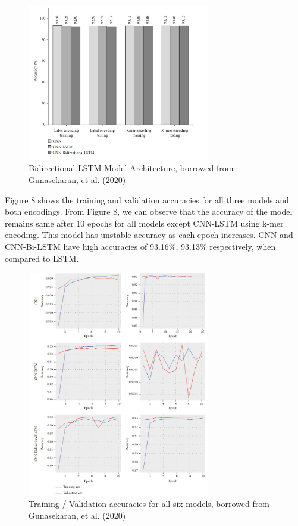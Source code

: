 \documentclass[journal]{IEEEtran}
\begin{document}
\begin{figure}
  \centering
  \includegraphics[width=8cm]{figures/accuracy.png}
  \caption{Bidirectional LSTM Model Architecture, borrowed from Gunasekaran, et al. (2020)}
\end{figure}

Figure 8 shows the training and validation accuracies for all three models and both encodings. 
From Figure 8, we can observe that the accuracy of the model remains same after 10 epochs for all models 
except CNN-LSTM using k-mer encoding. This model has unstable accuracy as each epoch increases.
CNN and CNN-Bi-LSTM have high accuracies of 93.16\%, 93.13\% respectively, when compared to LSTM.

\begin{figure}
\centering
  \includegraphics[width=8cm]{figures/train_vrs_valid_accuracies.png}
  \caption{Training / Validation accuracies for all six models, borrowed from Gunasekaran, et al. (2020)}
\end{figure}
\end{document}
